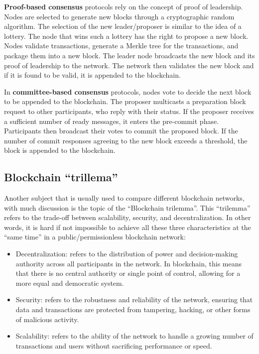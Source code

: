 \textbf{Proof-based consensus} protocols rely on the concept of proof of leadership. Nodes are selected to generate new blocks through a cryptographic random algorithm. The selection of the new leader/proposer is similar to the idea of a lottery. The node that wins such a lottery has the right to propose a new block.
Nodes validate transactions, generate a Merkle tree for the transactions, and package them into a new block. The leader node broadcasts the new block and its proof of leadership to the network. The network then validates the new block and if it is found to be valid, it is appended to the blockchain.

In \textbf{committee-based consensus} protocols, nodes vote to decide the next block to be appended to the blockchain. The proposer multicasts a preparation block request to other participants, who reply with their status. If the proposer receives a sufficient number of ready messages, it enters the pre-commit phase. Participants then broadcast their votes to commit the proposed block. If the number of commit responses agreeing to the new block exceeds a threshold, the block is appended to the blockchain.

\subsection*{Blockchain ``trillema''}

Another subject that is usually used to compare different blockchain networks, with much discussion is the topic of the ``Blockchain trilemma''.
This ``trilemma'' refers to the trade-off between scalability, security, and decentralization. 
In other words, it is hard if not impossible to achieve all these three characteristics at the ``same time'' in a public/permissionless blockchain network:
\begin{itemize}
    \item Decentralization: refers to the distribution of power and decision-making authority across all participants in the network. In blockchain, this means that there is no central authority or single point of control, allowing for a more equal and democratic system.
    \item Security: refers to the robustness and reliability of the network, ensuring that data and transactions are protected from tampering, hacking, or other forms of malicious activity.
    \item Scalability: refers to the ability of the network to handle a growing number of transactions and users without sacrificing performance or speed.
\end{itemize}

